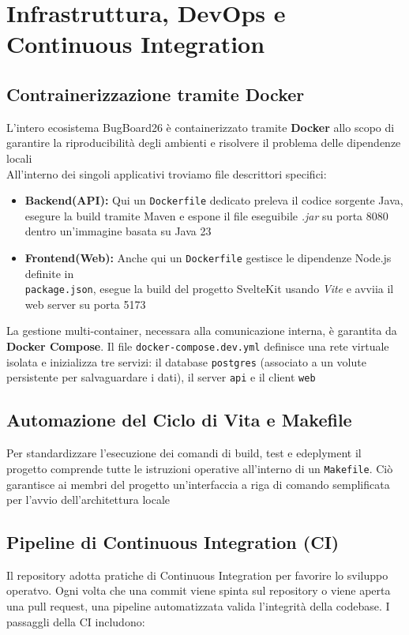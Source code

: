 \newpage
\chapter{Infrastruttura, DevOps e Continuous Integration}

\section{Contrainerizzazione tramite Docker}
L'intero ecosistema BugBoard26 è containerizzato tramite \textbf{Docker} allo scopo di garantire la riproducibilità degli ambienti e risolvere il problema delle dipendenze locali \\
All'interno dei singoli applicativi troviamo file descrittori specifici:
\begin{itemize}
    \item \textbf{Backend(API):} Qui un \texttt{Dockerfile} dedicato preleva il codice sorgente Java, esegure la build tramite Maven e espone il file eseguibile \textit{.jar} su porta 8080 dentro un'immagine basata su Java 23
    \item \textbf{Frontend(Web):} Anche qui un \texttt{Dockerfile} gestisce le dipendenze Node.js definite in \\ \texttt{package.json}, esegue la build del progetto SvelteKit usando \textit{Vite} e avviia il web server su porta 5173
\end{itemize}
La gestione multi-container, necessara alla comunicazione interna, è garantita da \textbf{Docker Compose}. Il file \texttt{docker-compose.dev.yml} definisce una rete virtuale isolata e inizializza tre servizi: il database \texttt{postgres} (associato a un volute persistente per salvaguardare i dati), il server \texttt{api} e il client \texttt{web}

\section{Automazione del Ciclo di Vita e Makefile}
Per standardizzare l'esecuzione dei comandi di build, test e edeplyment il progetto comprende tutte le istruzioni operative all'interno di un \texttt{Makefile}. Ciò garantisce ai membri del progetto un'interfaccia a riga di comando semplificata per l'avvio dell'architettura locale

\section{Pipeline di Continuous Integration (CI)}
Il repository adotta pratiche di Continuous Integration per favorire lo sviluppo operatvo. Ogni volta che una commit viene spinta sul repository o viene aperta una pull request, una pipeline automatizzata valida l'integrità della codebase. I passag\textbf{}gli della CI includono:

